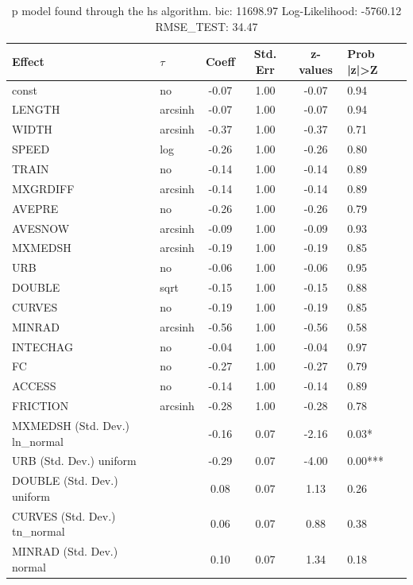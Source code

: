 \begin{table}
	\caption{p model found through the hs algorithm. bic: 11698.97 Log-Likelihood: -5760.12 RMSE_TEST: 34.47}
	\begin{center}
		\begin{tabular}{|l|l|c|c|c|l|}
			\hline
			Effect & $\tau$ & Coeff & Std. Err & z-values & Prob |z|>Z \\
			\hline
			const & no & -0.07 & 1.00 & -0.07 & 0.94 \\
			\hline
			LENGTH & arcsinh & -0.07 & 1.00 & -0.07 & 0.94 \\
			\hline
			WIDTH & arcsinh & -0.37 & 1.00 & -0.37 & 0.71 \\
			\hline
			SPEED & log & -0.26 & 1.00 & -0.26 & 0.80 \\
			\hline
			TRAIN & no & -0.14 & 1.00 & -0.14 & 0.89 \\
			\hline
			MXGRDIFF & arcsinh & -0.14 & 1.00 & -0.14 & 0.89 \\
			\hline
			AVEPRE & no & -0.26 & 1.00 & -0.26 & 0.79 \\
			\hline
			AVESNOW & arcsinh & -0.09 & 1.00 & -0.09 & 0.93 \\
			\hline
			MXMEDSH & arcsinh & -0.19 & 1.00 & -0.19 & 0.85 \\
			\hline
			URB & no & -0.06 & 1.00 & -0.06 & 0.95 \\
			\hline
			DOUBLE & sqrt & -0.15 & 1.00 & -0.15 & 0.88 \\
			\hline
			CURVES & no & -0.19 & 1.00 & -0.19 & 0.85 \\
			\hline
			MINRAD & arcsinh & -0.56 & 1.00 & -0.56 & 0.58 \\
			\hline
			INTECHAG & no & -0.04 & 1.00 & -0.04 & 0.97 \\
			\hline
			FC & no & -0.27 & 1.00 & -0.27 & 0.79 \\
			\hline
			ACCESS & no & -0.14 & 1.00 & -0.14 & 0.89 \\
			\hline
			FRICTION & arcsinh & -0.28 & 1.00 & -0.28 & 0.78 \\
			\hline
			MXMEDSH (Std. Dev.) ln_normal &  & -0.16 & 0.07 & -2.16 & 0.03* \\
			\hline
			URB (Std. Dev.) uniform &  & -0.29 & 0.07 & -4.00 & 0.00*** \\
			\hline
			DOUBLE (Std. Dev.) uniform &  & 0.08 & 0.07 & 1.13 & 0.26 \\
			\hline
			CURVES (Std. Dev.) tn_normal &  & 0.06 & 0.07 & 0.88 & 0.38 \\
			\hline
			MINRAD (Std. Dev.) normal &  & 0.10 & 0.07 & 1.34 & 0.18 \\

\end{tabular}
\end{center}
\end{table}
